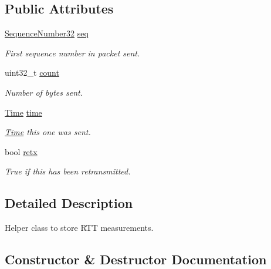 \subsection*{Public Attributes}
\begin{DoxyCompactItemize}
\item 
\hyperlink{group__network_gacb2070e4e98d2d5135c9bede58f07a03}{Sequence\+Number32} \hyperlink{classns3_1_1RttHistory_accdecbcb32037dd67fb2e048901d5d0f}{seq}
\begin{DoxyCompactList}\small\item\em First sequence number in packet sent. \end{DoxyCompactList}\item 
uint32\+\_\+t \hyperlink{classns3_1_1RttHistory_a1f5d2dd2d6b30aa89c5f7cd7301ba3a0}{count}
\begin{DoxyCompactList}\small\item\em Number of bytes sent. \end{DoxyCompactList}\item 
\hyperlink{classns3_1_1Time}{Time} \hyperlink{classns3_1_1RttHistory_ab1dedd70854fa8dd017f4c9b10ce4c51}{time}
\begin{DoxyCompactList}\small\item\em \hyperlink{classns3_1_1Time}{Time} this one was sent. \end{DoxyCompactList}\item 
bool \hyperlink{classns3_1_1RttHistory_aa09a8578166430fa105d30606c56cc5c}{retx}
\begin{DoxyCompactList}\small\item\em True if this has been retransmitted. \end{DoxyCompactList}\end{DoxyCompactItemize}


\subsection{Detailed Description}
Helper class to store R\+TT measurements. 

\subsection{Constructor \& Destructor Documentation}
